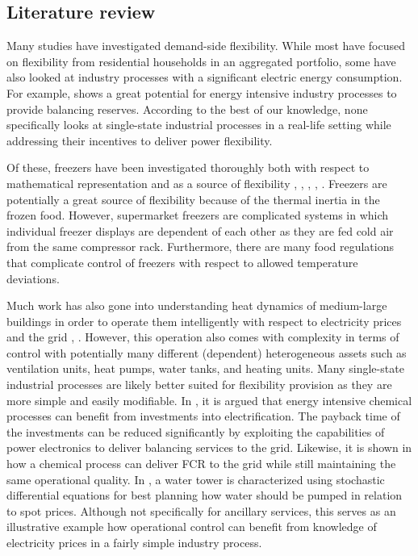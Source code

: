 \documentclass[conference]{IEEEtran}
\begin{document}

\subsection{Literature review}

Many studies have investigated demand-side flexibility. While most have focused on flexibility from residential households in an aggregated portfolio, some have also looked at industry processes with a significant electric energy consumption. For example, \cite{paulus2011potential} shows a great potential for energy intensive industry processes to provide balancing reserves. According to the best of our knowledge, none specifically looks at single-state industrial processes in a real-life setting while addressing their incentives to deliver power flexibility.

Of these, freezers have been investigated thoroughly both with respect to mathematical representation \cite{pedersen2016improving}  and as a source of flexibility \cite{sossan2016grey}, \cite{o2013modelling}, \cite{de2019leveraging}, \cite{misaghian2022fast}, \cite{vrettos2016fast}. Freezers are potentially a great source of flexibility because of the thermal inertia in the frozen food. However, supermarket freezers are complicated systems in which individual freezer displays are dependent of each other as they are fed cold air from the same compressor rack. Furthermore, there are many food regulations that complicate control of freezers with respect to allowed temperature deviations.

Much work has also gone into understanding heat dynamics of medium-large buildings \cite{thilker2021non} in order to operate them intelligently with respect to electricity prices and the grid \cite{contreras2018tractable}, \cite{finck2018quantifying}. However, this operation also comes with complexity in terms of control with potentially many different (dependent) heterogeneous assets such as ventilation units, heat pumps, water tanks, and heating units. Many single-state industrial processes are likely better suited for flexibility provision as they are more simple and easily modifiable.
%
In \cite{mallapragada2023decarbonization}, it is argued that energy intensive chemical processes can benefit from investments into electrification. The payback time of the investments can be reduced significantly by exploiting the capabilities of power electronics to deliver balancing services to the grid. Likewise, it is shown in \cite{samani2022flexible} how a chemical process can deliver FCR to the grid while still maintaining the same operational quality.
%
In \cite{junker2020stochastic}, a water tower is characterized using stochastic differential equations for best planning how water should be pumped in relation to spot prices. Although not specifically for ancillary services, this serves as an illustrative example how operational control can benefit from knowledge of electricity prices in a fairly simple industry process.
\end{document}
